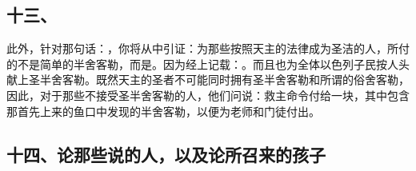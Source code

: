 
\subsection{十三、}

此外，针对那句话：，你将从中引证：为那些按照天主的法律成为圣洁的人，所付的不是简单的半舍客勒，而是。因为经上记载：。而且也为全体以色列子民按人头献上圣半舍客勒。既然天主的圣者不可能同时拥有圣半舍客勒和所谓的俗舍客勒，因此，对于那些不接受圣半舍客勒的人，他们问说：救主命令付给一块，其中包含那首先上来的鱼口中发现的半舍客勒，以便为老师和门徒付出。\par


\subsection{十四、论那些说的人，以及论所召来的孩子}

